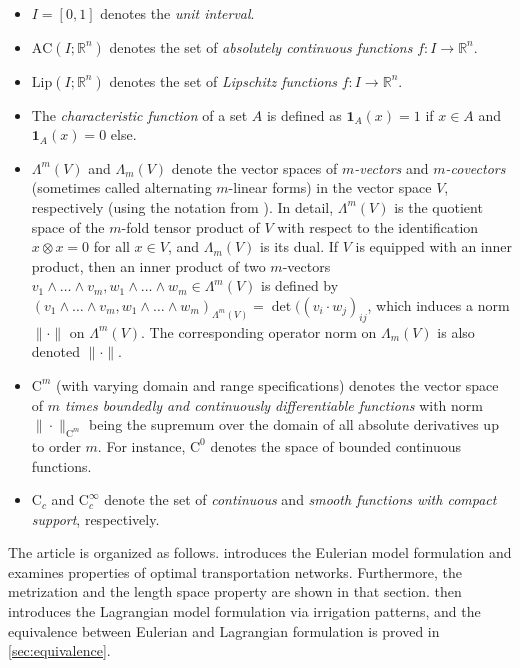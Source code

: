 \documentclass[10pt,a4paper,oneside,final]{article}
\newcommand{\R}{{\mathbb{R}}}
\newcommand{\setchar}[1]{\mathbf{1}_{#1}}
\newcommand{\AC}{\mathrm{AC}}
\newcommand{\Lip}{\mathrm{Lip}}
\newcommand{\cont}{{\mathrm{C}}}
\newcommand{\contsmooth}{\cont_{c}^{\infty}}
\numberwithin{equation}{section}
\theoremstyle{plain}
\theoremstyle{definition}
\theoremstyle{remark}
\begin{document}
\begin{itemize}
 \item $I=[0,1]$ denotes the \emph{unit interval}.

 \item $\AC(I;\R^n)$ denotes the set of \emph{absolutely continuous functions} $f:I\to\R^n$.

 \item $\Lip(I;\R^n)$ denotes the set of \emph{Lipschitz functions} $f:I\to\R^n$.

 \item The \emph{characteristic function} of a set $A$ is defined as $\setchar{A}(x)=1$ if $x\in A$ and $\setchar A(x)=0$ else.

 \item $\Lambda^m(V)$ and $\Lambda_m(V)$ denote the vector spaces of \emph{$m$-vectors} and \emph{$m$-covectors} (sometimes called alternating $m$-linear forms) in the vector space $V$, respectively (using the notation from \cite[1.3-4]{Fe69}).
 In detail, $\Lambda^m(V)$ is the quotient space of the $m$-fold tensor product of $V$ with respect to the identification $x\otimes x=0$ for all $x\in V$, and $\Lambda_m(V)$ is its dual.
 If $V$ is equipped with an inner product, then an inner product of two $m$-vectors $v_1\wedge\ldots\wedge v_m,w_1\wedge\ldots\wedge w_m\in\Lambda^m(V)$ is defined by $(v_1\wedge\ldots\wedge v_m,w_1\wedge\ldots\wedge w_m)_{\Lambda^m(V)}=\det((v_i\cdot w_j)_{ij}$,
 which induces a norm $\|\cdot\|$ on $\Lambda^m(V)$.
 The corresponding operator norm on $\Lambda_m(V)$ is also denoted $\|\cdot\|$.

 \item $\cont^m$ (with varying domain and range specifications) denotes the vector space of \emph{$m$ times boundedly and continuously differentiable functions} with norm $\|\cdot\|_{\cont^m}$ being the supremum over the domain of all absolute derivatives up to order $m$.
 For instance, $\cont^0$ denotes the space of bounded continuous functions.
 
 \item $\cont_c$ and $\contsmooth$ denote the set of \emph{continuous} and \emph{smooth functions with compact support}, respectively.

\end{itemize}

The article is organized as follows.
 introduces the Eulerian model formulation and examines properties of optimal transportation networks.
Furthermore, the metrization and the length space property are shown in that section.
 then introduces the Lagrangian model formulation via irrigation patterns,
and the equivalence between Eulerian and Lagrangian formulation is proved in \cref{sec:equivalence}.
\end{document}
